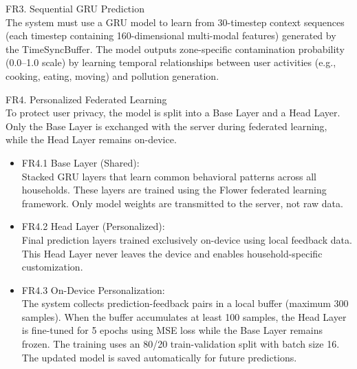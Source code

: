 \documentclass[conference]{IEEEtran}
\begin{document}
\begin{description}
\begin{itemize}
    \end{itemize}

    \item[3)] FR3. Sequential GRU Prediction \\
    The system must use a GRU model to learn from 30-timestep context sequences (each timestep containing 160-dimensional multi-modal features) generated by the TimeSyncBuffer. The model outputs zone-specific contamination probability (0.0–1.0 scale) by learning temporal relationships between user activities (e.g., cooking, eating, moving) and pollution generation.

    \item[4)] FR4. Personalized Federated Learning \\
    To protect user privacy, the model is split into a Base Layer and a Head Layer. Only the Base Layer is exchanged with the server during federated learning, while the Head Layer remains on-device.

    \begin{itemize}
        \item FR4.1 Base Layer (Shared): \\
        Stacked GRU layers that learn common behavioral patterns across all households. These layers are trained using the Flower federated learning framework. Only model weights are transmitted to the server, not raw data.
        \item FR4.2 Head Layer (Personalized): \\
        Final prediction layers trained exclusively on-device using local feedback data. This Head Layer never leaves the device and enables household-specific customization.
        \item FR4.3 On-Device Personalization: \\
        The system collects prediction-feedback pairs in a local buffer (maximum 300 samples). When the buffer accumulates at least 100 samples, the Head Layer is fine-tuned for 5 epochs using MSE loss while the Base Layer remains frozen. The training uses an 80/20 train-validation split with batch size 16. The updated model is saved automatically for future predictions.

    \end{itemize}


\end{description}
\end{document}
